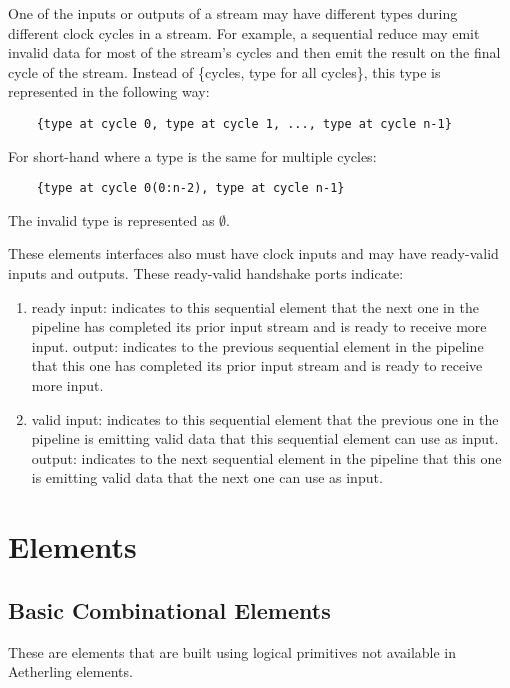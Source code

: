 \documentclass[11pt,fleqn]{article}
\numberwithin{equation}{subsection}
\begin{document}
One of the inputs or outputs of a stream may have different types during different
clock cycles in a stream. For example, a sequential reduce may emit invalid 
data for most of the stream's cycles and then emit the result on the final
cycle of the stream. Instead of \{cycles, type for all cycles\}, 
this type is represented in the following way:
\begin{lstlisting}
    {type at cycle 0, type at cycle 1, ..., type at cycle n-1}
\end{lstlisting}
For short-hand where a type is the same for multiple cycles:
\begin{lstlisting}
    {type at cycle 0(0:n-2), type at cycle n-1}
\end{lstlisting}
The invalid type is represented as $\emptyset$.

These elements interfaces also must have clock inputs and may have ready-valid 
inputs and outputs. These ready-valid handshake ports indicate:
\begin{enumerate}
        \item ready
            \subitem input: indicates to this sequential element that the next 
            one in the pipeline has completed its prior input stream and is 
            ready to receive more input.
            \subitem output: indicates to the previous sequential element in the 
            pipeline that this one has completed its prior input stream and is
            ready to receive more input.
        \item valid
            \subitem input: indicates to this sequential element that the previous
            one in the pipeline is emitting valid data that this sequential 
            element can use as input.
            \subitem output: indicates to the next sequential element in the
            pipeline that this one is emitting valid data that the next one
            can use as input.
\end{enumerate}

\section{Elements}

\subsection{Basic Combinational Elements}
These are elements that are built using logical primitives not available in
Aetherling elements.
\end{document}
